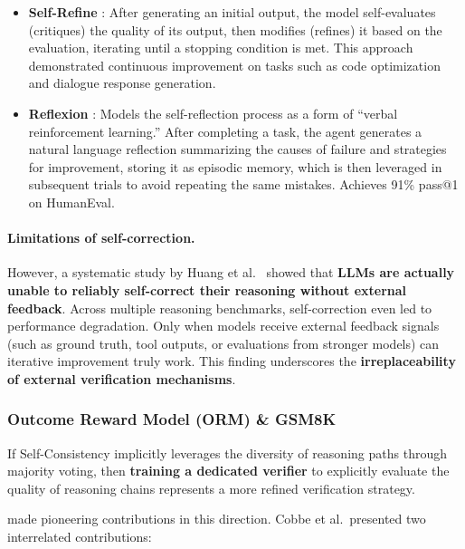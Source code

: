 \begin{itemize}[leftmargin=2em]
  \item \textbf{Self-Refine} \cite{madaan2023selfrefine}:
    After generating an initial output, the model self-evaluates (critiques) the quality of its output,
    then modifies (refines) it based on the evaluation, iterating until a stopping condition is met.
    This approach demonstrated continuous improvement on tasks such as code optimization and dialogue response generation.

  \item \textbf{Reflexion} \cite{shinn2023reflexion}:
    Models the self-reflection process as a form of ``verbal reinforcement learning.''
    After completing a task, the agent generates a natural language reflection
    summarizing the causes of failure and strategies for improvement, storing it as episodic memory,
    which is then leveraged in subsequent trials to avoid repeating the same mistakes.
    Achieves 91\% pass@1 on HumanEval.
\end{itemize}

\paragraph{Limitations of self-correction.}
However, a systematic study by Huang et al.\ \cite{huang2024selfcorrect} showed that
\textbf{LLMs are actually unable to reliably self-correct their reasoning without external feedback}.
Across multiple reasoning benchmarks, self-correction even led to performance degradation.
Only when models receive external feedback signals (such as ground truth, tool outputs, or evaluations from stronger models)
can iterative improvement truly work.
This finding underscores the \textbf{irreplaceability of external verification mechanisms}.

\subsubsection{Outcome Reward Model (ORM) \& GSM8K}
\label{sec:t4-orm}

If Self-Consistency implicitly leverages the diversity of reasoning paths through majority voting,
then \textbf{training a dedicated verifier} to explicitly evaluate the quality of reasoning chains
represents a more refined verification strategy.

 made pioneering contributions in this direction.
Cobbe et al.\ presented two interrelated contributions:

